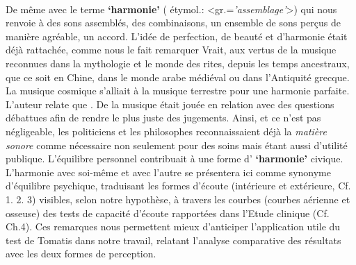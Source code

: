 \paragraph{}
De même avec le terme \textbf{`harmonie'} ( étymol.:
<gr.=\textit{'assemblage'}>) qui nous renvoie à
 des sons assemblés, des combinaisons, un ensemble de sons perçus de
 manière agréable, un accord. L'idée de perfection, de beauté et d'harmonie était déjà rattachée, comme nous le fait remarquer Vrait, aux  vertus de la musique reconnues dans la mythologie et le
 monde des rites, depuis les temps ancestraux, que ce soit en Chine, dans le monde arabe
 médiéval ou dans l'Antiquité grecque. La musique cosmique s'alliait  à la musique terrestre pour une harmonie parfaite.
 L'auteur relate que  \autocite[80]{vrait_musicotherapie_2018}. De la musique était jouée en relation avec des questions débattues afin de rendre le plus juste des jugements.
Ainsi, et ce n'est pas négligeable, les  politiciens  et les
philosophes reconnaissaient déjà la \textit{matière sonore} comme nécessaire non seulement pour  des soins mais étant aussi d'utilité
publique.
 L'équilibre personnel contribuait à une forme d' \textbf{`harmonie'} civique.
L'harmonie avec soi-même et avec l'autre se présentera ici comme synonyme d'équilibre
psychique, traduisant les formes d'écoute (intérieure et
extérieure, Cf. 1. 2. 3) visibles, selon notre hypothèse,
 à travers les courbes (courbes aérienne et osseuse) des tests de capacité d'écoute rapportées
dans l'Etude clinique (Cf. Ch.4).
Ces remarques nous permettent mieux d'anticiper
l'application utile du test de Tomatis dans notre travail, relatant l'analyse
comparative des résultats avec les deux formes de perception.


